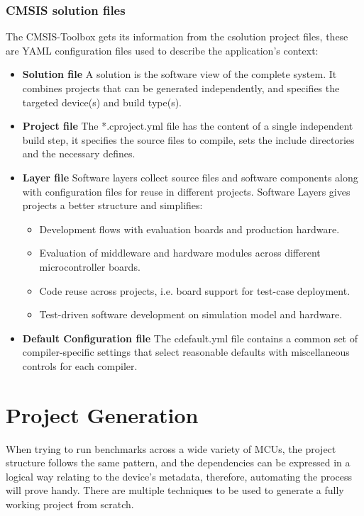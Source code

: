 \subsubsection{CMSIS solution files}
The CMSIS-Toolbox gets its information from the csolution project files, these are YAML configuration files used to describe the application's context:
\begin{itemize}
	\item \textbf{Solution file} A solution is the software view of the complete system. It combines projects that can be generated independently, and specifies the targeted device(s) and build type(s).
	\item \textbf{Project file} The *.cproject.yml file has the content of a single independent build step, it specifies the source files to compile, sets the include directories and the necessary defines.
	\item \textbf{Layer file} Software layers collect source files and software components along with configuration files for reuse in different projects. Software Layers gives projects a better structure and simplifies:
	\begin{itemize}
		\item Development flows with evaluation boards and production hardware.
		\item Evaluation of middleware and hardware modules across different microcontroller boards.
		\item Code reuse across projects, i.e. board support for test-case deployment.
		\item Test-driven software development on simulation model and hardware.
	\end{itemize}
	\item \textbf{Default Configuration file} The cdefault.yml file contains a common set of compiler-specific settings that select reasonable defaults with miscellaneous controls for each compiler.
\end{itemize}

\section{Project Generation}
When trying to run benchmarks across a wide variety of MCUs, the project structure follows the same pattern, and the dependencies can be expressed in a logical way relating to the device's metadata, therefore, automating the process will prove handy.
There are multiple techniques to be used to generate a fully working project from scratch.
